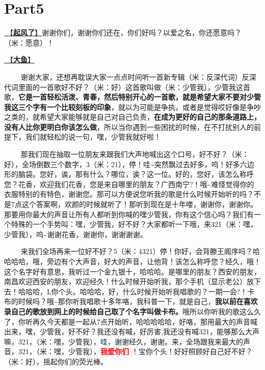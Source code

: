 \documentclass[]{ctexbook}
\begin{document}
\section{Part5}\label{nanchang-20241123-part5}

\hyperref[the-wind-rises]{🎵【\textbf{起风了}】}谢谢你们，谢谢你们还在，你们好吗？以爱之名，你还愿意吗？（米：愿意）！

\hyperref[big-fish]{🎵【\textbf{大鱼}】}

   谢谢大家，还想再耽误大家一点点时间听一首新专辑（米：反深代词）反深代词里面的一首歌好不好？（米：好）这首歌叫做（米：少管我），少管我这首歌，\textbf{它是一首轻松活泼、青春，然后特别开心的一首歌，就是希望大家不要对少管我这三个字有一个比较刻板的印象}，就以为可能是争执，或者是觉得哎好像是争吵之类的，就希望大家能够就是自己对自己负责，\textbf{在成为更好的自己的那条道路上，没有人比你更明白你该怎么做}，所以当你遇到一些困扰的时候，在不打扰别人的前提下，我们就轻松的说一句，嘿，少管我就好啦！

   那我们现在抽取一位朋友来跟我们大声地喊出这个口号，好不好？（米：好），全场倒数三个数字，3（米：21），停！哇\textasciitilde 突然飘过去好多，呜！好多六边形的脑袋。您好，诶，那有什么？哪位，诶？这一位。好的，您好，该怎么称呼您？花香，欢迎我们花香，您是来自哪里的朋友？广西南宁?！哦\textasciitilde 难怪觉得你的衣服特别的有特色，谢谢您。那可以方便说您听我的歌是什么时候开始听的吗？不是7点这个答案啊，欢颜的时候就听了！那听到现在是十年喽，谢谢你，谢谢你。那要用你最大的声音让所有人都听到你喊的嘿少管我，你有这个信心吗？我们有一个特殊的一个手势叫：嘿，少管我，好不好？大家都听一下哦，来321（米：嘿，少管我），呜\textasciitilde 谢谢花香，谢谢你，谢谢谢谢。

   来我们全场再来一位好不好？5（米：4321）停！你好，会背滕王阁序吗？哈哈哈哈，哦，旁边有个大声音，好大的声音，让他背！该怎么称呼您？经久，哦！这个名字好有意思，我听过一个金九银十，哈哈哈。是哪里的朋友？西安的朋友，南昌欢迎西安的朋友，欢迎经久！什么时候开始听我，那个手机（显示老公）放下去！哈哈哈，L你个头。哈哈哈，好，什么时候开始听我唱歌的？一期一会?！卡布的时候吗？哦\textasciitilde 那你听我唱歌十多年咯，我科普一下，就是自己，\textbf{我以前在喜欢录自己的歌放到网上的时候给自己取了个名字叫做卡布。}哦所以你听我的歌这么久了，你听再久今天都是一起从7点开始听，哈哈哈哈哈，好咯，那用最大的声音喊出来，嘿，少管我，好不好？我还没有喊，好厉害,我还没有喊321，能够那么大声嘛，321，（米：嘿，少管我），哇，谢谢经久，谢谢。来，全场跟我来最大的声音，321，（米：嘿，少管我），\textbf{\textcolor{red}{我爱你们} }！宝你个头！好好照顾好自己好不好？（米：好），摇起你们的荧光棒。
\end{document}
